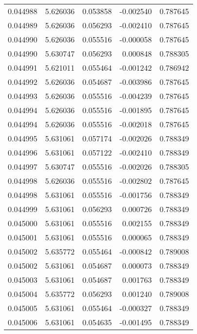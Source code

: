 \begin{tabular}{lrrrr}
0.044988    &  5.626036 &  0.053858 & -0.002540 &             0.787645 \\
0.044989    &  5.626036 &  0.056293 & -0.002410 &             0.787645 \\
0.044990    &  5.626036 &  0.055516 & -0.000058 &             0.787645 \\
0.044990    &  5.630747 &  0.056293 &  0.000848 &             0.788305 \\
0.044991    &  5.621011 &  0.055464 & -0.001242 &             0.786942 \\
0.044992    &  5.626036 &  0.054687 & -0.003986 &             0.787645 \\
0.044993    &  5.626036 &  0.055516 & -0.004239 &             0.787645 \\
0.044994    &  5.626036 &  0.055516 & -0.001895 &             0.787645 \\
0.044994    &  5.626036 &  0.055516 & -0.002018 &             0.787645 \\
0.044995    &  5.631061 &  0.057174 & -0.002026 &             0.788349 \\
0.044996    &  5.631061 &  0.057122 & -0.002410 &             0.788349 \\
0.044997    &  5.630747 &  0.055516 & -0.002026 &             0.788305 \\
0.044998    &  5.626036 &  0.055516 & -0.002802 &             0.787645 \\
0.044998    &  5.631061 &  0.055516 & -0.001756 &             0.788349 \\
0.044999    &  5.631061 &  0.056293 &  0.000726 &             0.788349 \\
0.045000    &  5.631061 &  0.055516 &  0.002155 &             0.788349 \\
0.045001    &  5.631061 &  0.055516 &  0.000065 &             0.788349 \\
0.045002    &  5.635772 &  0.055464 & -0.000842 &             0.789008 \\
0.045002    &  5.631061 &  0.054687 &  0.000073 &             0.788349 \\
0.045003    &  5.631061 &  0.054687 &  0.001763 &             0.788349 \\
0.045004    &  5.635772 &  0.056293 &  0.001240 &             0.789008 \\
0.045005    &  5.631061 &  0.055464 & -0.000327 &             0.788349 \\
0.045006    &  5.631061 &  0.054635 & -0.001495 &             0.788349 \\

\end{tabular}
